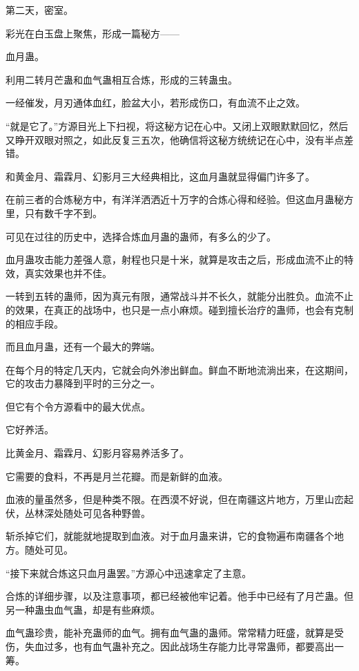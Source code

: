 
\begin{this_body}



第二天，密室。

彩光在白玉盘上聚焦，形成一篇秘方——

血月蛊。

利用二转月芒蛊和血气蛊相互合炼，形成的三转蛊虫。

一经催发，月刃通体血红，脸盆大小，若形成伤口，有血流不止之效。

“就是它了。”方源目光上下扫视，将这秘方记在心中。又闭上双眼默默回忆，然后又睁开双眼对照之，如此反复三五次，他确信将这秘方统统记在心中，没有半点差错。

和黄金月、霜霖月、幻影月三大经典相比，这血月蛊就显得偏门许多了。

在前三者的合炼秘方中，有洋洋洒洒近十万字的合炼心得和经验。但这血月蛊秘方里，只有数千字不到。

可见在过往的历史中，选择合炼血月蛊的蛊师，有多么的少了。

血月蛊攻击能力差强人意，射程也只是十米，就算是攻击之后，形成血流不止的特效，真实效果也并不佳。

一转到五转的蛊师，因为真元有限，通常战斗并不长久，就能分出胜负。血流不止的效果，在真正的战场中，也只是一点小麻烦。碰到擅长治疗的蛊师，也会有克制的相应手段。

而且血月蛊，还有一个最大的弊端。

在每个月的特定几天内，它就会向外渗出鲜血。鲜血不断地流淌出来，在这期间，它的攻击力暴降到平时的三分之一。

但它有个令方源看中的最大优点。

它好养活。

比黄金月、霜霖月、幻影月容易养活多了。

它需要的食料，不再是月兰花瓣。而是新鲜的血液。

血液的量虽然多，但是种类不限。在西漠不好说，但在南疆这片地方，万里山峦起伏，丛林深处随处可见各种野兽。

斩杀掉它们，就能就地提取到血液。对于血月蛊来讲，它的食物遍布南疆各个地方。随处可见。

“接下来就合炼这只血月蛊罢。”方源心中迅速拿定了主意。

合炼的详细步骤，以及注意事项，都已经被他牢记着。他手中已经有了月芒蛊。但另一种蛊虫血气蛊，却是有些麻烦。

血气蛊珍贵，能补充蛊师的血气。拥有血气蛊的蛊师。常常精力旺盛，就算是受伤，失血过多，也有血气蛊补充之。因此战场生存能力比寻常蛊师，都要高出一筹。


\end{this_body}

